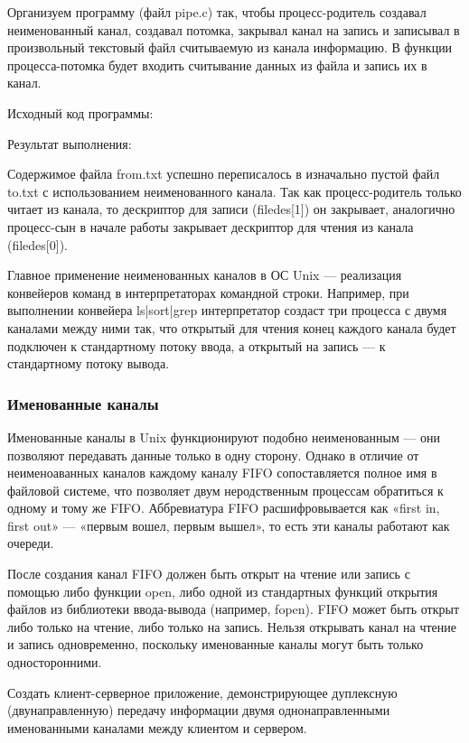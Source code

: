 \documentclass[a4paper]{article}
\begin{document}
	Организуем программу (файл pipe.c) так, чтобы процесс-родитель создавал неименованный канал, создавал потомка, закрывал канал на запись и записывал в произвольный текстовый файл считываемую из канала информацию. В функции процесса-потомка будет входить считывание данных из файла и запись их в канал.
	
	Исходный код программы:
	
	
	Результат выполнения:
	

	Содержимое файла from.txt успешно переписалось в изначально пустой файл to.txt с использованием неименованного канала.	Так как процесс-родитель только читает из канала, то дескриптор для записи (filedes[1]) он закрывает, аналогично процесс-сын в начале работы закрывает дескриптор для чтения из канала (filedes[0]).

	Главное применение неименованных каналов в ОС Unix --– реализация конвейеров команд в интерпретаторах командной строки. Например, при выполнении конвейера ls|sort|grep интерпретатор создаст три процесса с двумя каналами между ними так, что открытый для чтения конец каждого канала будет подключен к стандартному потоку ввода, а открытый на запись — к стандартному потоку вывода.
	
	\subsubsection{Именованные каналы}
	Именованные каналы в Unix функционируют подобно неименованным — они позволяют передавать данные только в одну сторону. Однако в отличие от неименоаванных каналов каждому каналу FIFO сопоставляется полное имя в файловой системе, что позволяет двум неродственным процессам обратиться к одному и тому же FIFO. Аббревиатура FIFO расшифровывается как «first in, first out» — «первым вошел, первым вышел», то есть эти каналы работают как очереди.
	
	После создания канал FIFO должен быть открыт на чтение или запись с помощью либо функции open, либо одной из стандартных функций открытия файлов из библиотеки ввода-вывода (например, fopen). FIFO может быть открыт либо только на чтение, либо только на запись. Нельзя открывать канал на чтение и запись одновременно, поскольку именованные каналы могут быть только односторонними.

	Создать клиент-серверное приложение, демонстрирующее дуплексную (двунаправленную) передачу информации двумя однонаправленными именованными каналами между клиентом и сервером.
	
\end{document}
